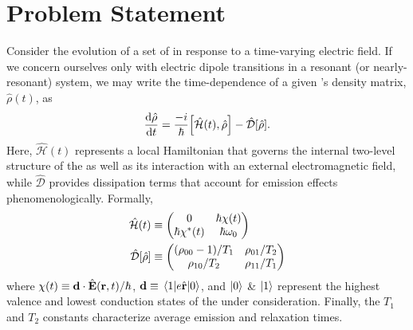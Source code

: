 \section{\label{section:problem statement}Problem Statement}
Consider the evolution of a set of \qds{} in response to a time-varying electric field.
If we concern ourselves only with electric dipole transitions in a resonant (or nearly-resonant) system, we may write the time-dependence of a given \qd's density matrix, $\hat{\rho}(t)$, as
\begin{equation}
  \dv{\hat{\rho}}{t} = \frac{-i}{\hbar}\commutator{\hat{\mathcal{H}}(t)}{\hat{\rho}} - \hat{\mathcal{D}}\qty[\hat{\rho}].
  \label{eq:liouville}
\end{equation}
Here, $\hat{\mathcal{H}}(t)$ represents a local Hamiltonian that governs the internal two-level structure of the \qd{} as well as its interaction with an external electromagnetic field, while $\hat{\mathcal{D}}$ provides dissipation terms that account for emission effects phenomenologically.
Formally,
\begin{subequations}
  \begin{align}
    \hat{\mathcal{H}}(t) &\equiv \mqty(0 & \hbar \chi(t) \\ \hbar \chi^*(t) & \hbar \omega_0) \label{eq:hamiltonian}\\
    \hat{\mathcal{D}}\qty[\hat{\rho}] &\equiv \mqty( \qty(\rho_{00} - 1)/{T_1} & \rho_{01}/{T_2} \\ \rho_{10}/{T_2} & \rho_{11}/T_1 ) \label{eq:dissipator}
  \end{align}
\end{subequations}
where $\chi(t) \equiv \vb{d} \cdot \hat{\vb{E}}(\vb{r}, t)/\hbar$, $\vb{d} \equiv \matrixel{1}{e \hat{\vb{r}}}{0}$, and $\ket{0}$ \& $\ket{1}$ represent the highest valence and lowest conduction states of the \qd{} under consideration.
Finally, the $T_1$ and $T_2$ constants characterize average emission and relaxation times.%

